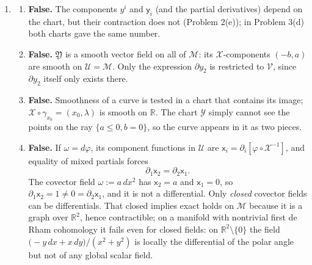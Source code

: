\documentclass[11pt]{article}
\newcommand{\Cinf}{C^\infty(\mathcal M)}
\begin{document}
\begin{enumerate}[label=(\alph*)]
\begin{align*}
S(\varphi\odot_\Gamma\mathfrak Z_1\oplus_\Gamma\mathfrak W_1,\mathfrak Z_2)&=dg\lceil\varphi\odot_\Gamma\mathfrak Z_1\oplus_\Gamma\mathfrak W_1\rfloor\odot_{C^\infty}dg\lceil\mathfrak Z_2\rfloor\\
&=\bigl(\varphi\odot_{C^\infty}dg\lceil\mathfrak Z_1\rfloor\oplus_{C^\infty}dg\lceil\mathfrak W_1\rfloor\bigr)\odot_{C^\infty}dg\lceil\mathfrak Z_2\rfloor\\
&=\varphi\odot_{C^\infty}S(\mathfrak Z_1,\mathfrak Z_2)\oplus_{C^\infty}S(\mathfrak W_1,\mathfrak Z_2).
\end{align*}
Here $\oplus_{C^\infty}$ and $\odot_{C^\infty}$ denote the pointwise sum and product of functions in $\Cinf$. The same computation in the second slot follows from symmetry of $S$.
\item
\begin{enumerate}[label=(\roman*)]
\item \textbf{False.} The components $y^i$ and $\mathsf y_i$ (and the partial derivatives) depend on the chart, but their contraction does not (Problem 2(e)); in Problem 3(d) both charts gave the same number.
\item \textbf{False.} $\mathfrak Y$ is a smooth vector field on all of $\mathcal M$: its $\mathcal X$-components $(-b,a)$ are smooth on $\mathcal U=\mathcal M$. Only the expression $\partial y_2$ is restricted to $\mathcal V$, since $\partial y_2$ itself only exists there.
\item \textbf{False.} Smoothness of a curve is tested in a chart that contains its image; $\mathcal X\circ\gamma_{x_0}=(x_0,\lambda)$ is smooth on $\mathbb R$. The chart $\mathcal Y$ simply cannot see the points on the ray $\{a\le0,b=0\}$, so the curve appears in it as two pieces.
\item \textbf{False.} If $\omega=d\varphi$, its component functions in $\mathcal U$ are $\mathsf x_i=\partial_i[\varphi\circ\mathcal X^{-1}]$, and equality of mixed partials forces
\[
\partial_1\mathsf x_2=\partial_2\mathsf x_1.
\]
The covector field $\omega:=a\,dx^2$ has $\mathsf x_2=a$ and $\mathsf x_1=0$, so $\partial_1\mathsf x_2=1\neq0=\partial_2\mathsf x_1$, and it is not a differential. Only \emph{closed} covector fields can be differentials.
That closed implies exact holds on $\mathcal M$ because it is a graph over $\mathbb R^2$, hence contractible; on a manifold with nontrivial first de Rham cohomology it fails even for closed fields: on $\mathbb R^2\setminus\{0\}$ the field
$\bigl(-y\,dx+x\,dy\bigr)/(x^2+y^2)$ is locally the differential of the polar angle but not of any global scalar field.
\end{enumerate}
\end{enumerate}
\end{document}
